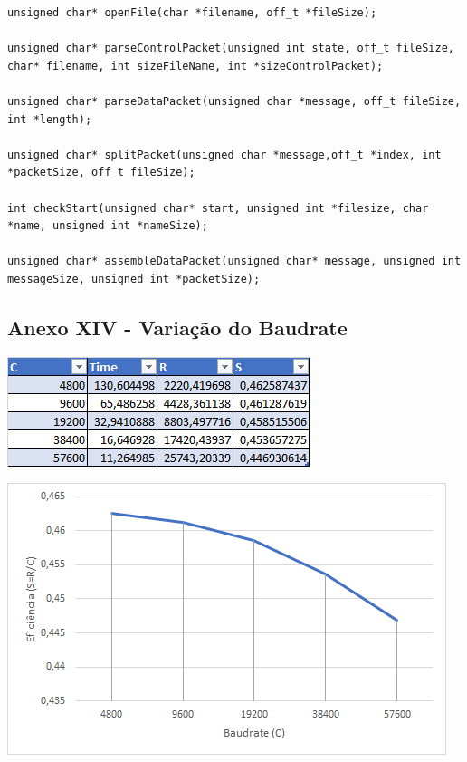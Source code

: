 \documentclass[11pt]{article}
\begin{document}
\begin{lstlisting}[style=CStyle]
unsigned char* openFile(char *filename, off_t *fileSize);

unsigned char* parseControlPacket(unsigned int state, off_t fileSize, char* filename, int sizeFileName, int *sizeControlPacket);

unsigned char* parseDataPacket(unsigned char *message, off_t fileSize, int *length);

unsigned char* splitPacket(unsigned char *message,off_t *index, int *packetSize, off_t fileSize);

int checkStart(unsigned char* start, unsigned int *filesize, char *name, unsigned int *nameSize);

unsigned char* assembleDataPacket(unsigned char* message, unsigned int messageSize, unsigned int *packetSize);

\end{lstlisting}

\pagebreak
 
\subsection{ Anexo XIV - Variação do Baudrate}

\includegraphics[width=\textwidth]{tabelaBaudrate.png}

\bigskip
\bigskip

\includegraphics[width=\textwidth]{baudrate.png}
\end{document}
